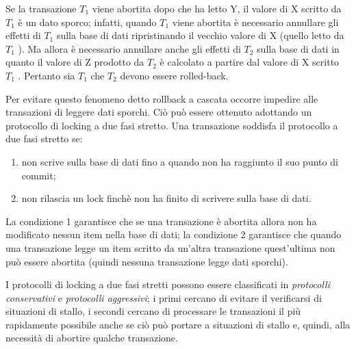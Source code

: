 Se la transazione $T_1$ viene abortita dopo che ha letto Y, il valore di X scritto da $T_1$ è un dato sporco; infatti, quando $T_1$ viene abortita è necessario annullare gli effetti di $T_1$ sulla base di dati ripristinando il vecchio valore di X (quello letto da $T_1$ ). Ma allora è necessario annullare anche gli effetti di $T_2$ sulla base di dati in quanto il valore di Z prodotto da $T_2$ è calcolato a partire dal valore di X scritto $T_1$ . Pertanto sia $T_1$ che $T_2$ devono essere rolled-back.

Per evitare questo fenomeno detto rollback a cascata occorre impedire alle transazioni di leggere dati sporchi. Ciò può essere ottenuto adottando un protocollo di locking a due fasi stretto. Una transazione soddisfa il protocollo a due fasi stretto se:
\begin{enumerate}
    \item non scrive sulla base di dati fino a quando non ha raggiunto il suo punto di commit;
    \item non rilascia un lock finchè non ha finito di scrivere sulla base di dati.
\end{enumerate}
La condizione 1 garantisce che se una transazione è abortita allora non ha modificato nessun item nella base di dati; la condizione 2 garantisce che quando una transazione legge un item scritto da un’altra transazione quest’ultima non può essere abortita (quindi nessuna transazione legge dati sporchi).

I protocolli di locking a due fasi stretti possono essere classificati in \textit{protocolli conservativi} e \textit{protocolli aggressivi}; i primi cercano di evitare il verificarsi di situazioni di stallo, i secondi cercano di processare le transazioni il più rapidamente possibile anche se ciò può portare a situazioni di stallo e, quindi, alla necessità di abortire qualche transazione.

